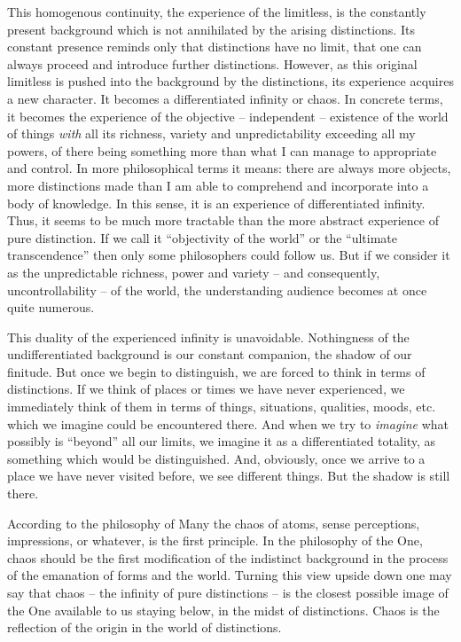 This homogenous continuity, the experience of the limitless, is the constantly
present background which is not annihilated by the arising distinctions. 
Its constant presence reminds only that distinctions have no limit, that one can always proceed and introduce
further distinctions. However, as this original limitless is pushed into
the background by the distinctions, its experience acquires a new character. 
It becomes a differentiated infinity or chaos. 
In concrete terms, it becomes the experience of the 
objective -- independent -- existence of the world of things {\em with} all its 
richness, variety and unpredictability exceeding all my powers, of there being 
something more than what I can manage to appropriate and control.  
In  more philosophical terms it means: there are always more objects, more distinctions made than I am able to comprehend and incorporate into a body of knowledge. In this sense, it is an experience of differentiated infinity. 
Thus, it seems to be much more tractable than the more abstract experience of 
pure distinction. 
If we call it ``objectivity of the world'' or the ``ultimate transcendence'' then only 
some philosophers could follow us. But if we consider it as the unpredictable richness, 
power and variety -- and consequently, uncontrollability -- of the world, the understanding audience becomes at once quite numerous.

This duality of the experienced infinity is unavoidable.
Nothingness of the undifferentiated background is our constant companion, the
shadow of our finitude. But
once we begin to distinguish, we are forced to think in terms of distinctions. 
If we think of places or times we have never experienced, we immediately think
of them in terms of things, situations, qualities, moods, etc. which we imagine
could be encountered there. And when we try to {\em imagine} what possibly is
``beyond'' all our limits, we imagine it as a differentiated totality, as 
something which would be distinguished. And, obviously, once we arrive to a 
place we have never visited before, we see different things. But the shadow is
still there.

According to the philosophy of Many the chaos of atoms, sense perceptions, impressions, or whatever, is the first principle. In the philosophy of the One, chaos should be the first modification of the indistinct background in the process of the emanation of forms and the world. Turning this view upside down one may say that chaos -- the infinity of pure distinctions -- is the closest possible image of the One available to us staying below, in the midst of distinctions. Chaos is the reflection of the origin in the world of distinctions. 


